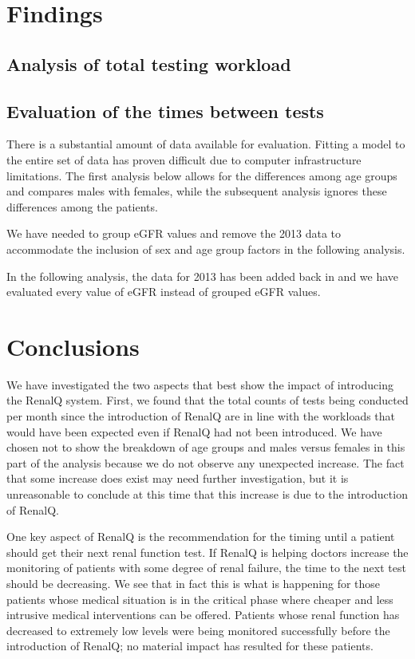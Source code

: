 \section{Findings} \label{Findings} 


\subsection{Analysis of total testing workload}




\subsection{Evaluation of the times between tests}


There is a substantial amount of data available for evaluation. Fitting a model to the entire set of data has proven difficult due to computer infrastructure limitations. The first analysis below allows for the differences among age groups and compares males with females, while the subsequent analysis  ignores these differences among the patients.

We have needed to group eGFR values and remove the 2013 data to accommodate the inclusion of sex and age group factors in the following analysis.


In the following analysis, the data for 2013 has been added back in and we have evaluated every value of eGFR instead of grouped eGFR values.


\section{Conclusions} \label{Conclusions}

We have investigated the two aspects that best show the impact of introducing the RenalQ system. First, we found that the total counts of tests being conducted  per month since the introduction of RenalQ are in line with the workloads that would have been expected  even if RenalQ had not been introduced. We have chosen not to show the breakdown of age groups and males versus females in this part of the analysis because we do not observe any unexpected increase. The fact that some increase does exist may need further investigation, but it is unreasonable to conclude at this time that this increase is due to the introduction of RenalQ.

One key aspect of RenalQ is the recommendation for the timing until a patient should get their next renal function test. If RenalQ is helping doctors increase the monitoring of patients with some degree of renal failure, the time to the next test should be decreasing. We see that in fact this is what is happening for those patients whose medical situation is in the critical phase where cheaper and less intrusive medical interventions can be offered.  Patients whose renal function has decreased to extremely low levels were being monitored successfully before the introduction of RenalQ; no material impact has resulted for these patients.

 
